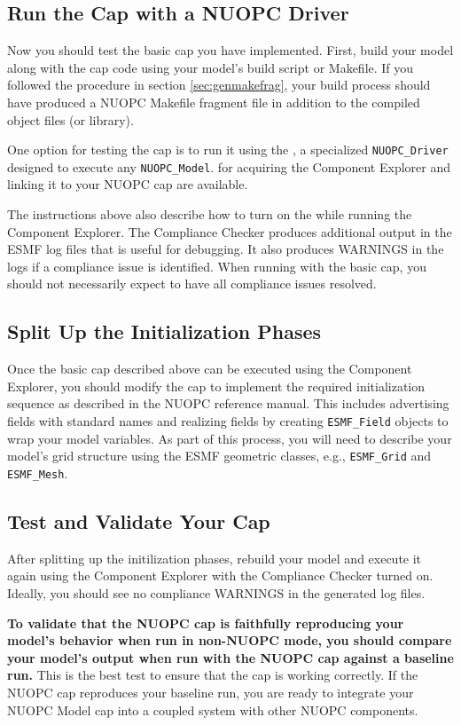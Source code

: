 \subsection{Run the Cap with a NUOPC Driver}
\label{sec:runcapwithdriver}
Now you should test the basic cap you have implemented. First,
build your model along with the cap code using your model's build
script or Makefile.  If you followed the procedure in section \ref{sec:genmakefrag}, 
your build process should have produced a NUOPC Makefile
fragment file in addition to the compiled object files (or library).

One option for testing the cap is to run it using the , a specialized {\tt NUOPC\_Driver} designed to execute any {\tt NUOPC\_Model}.  
 for acquiring 
the Component Explorer and linking it to your NUOPC cap are available.

The instructions above also describe how to turn on the  while running the Component Explorer.  The
Compliance Checker produces additional output in the ESMF log
files that is useful for debugging.  It also produces WARNINGS
in the logs if a compliance issue is identified.  When running with
the basic cap, you should not necessarily expect to have all compliance issues
resolved.


\subsection{Split Up the Initialization Phases}
\label{sec:splitinit}
Once the basic cap described above can be executed using the Component Explorer,
you should modify the cap to implement the required initialization sequence
as described in the NUOPC reference manual. This
includes advertising fields with standard names and realizing fields by creating
{\tt ESMF\_Field} objects to wrap your model variables.  As part of this process,
you will need to describe your model's grid structure using the ESMF geometric
classes, e.g., {\tt ESMF\_Grid} and {\tt ESMF\_Mesh}.


\subsection{Test and Validate Your Cap}
\label{sec:validatecap}
After splitting up the initilization phases, rebuild your model and execute it again using
the Component Explorer with the Compliance Checker turned on.  Ideally, you
should see no compliance WARNINGS in the generated log files.

\textbf{To validate that the NUOPC cap is faithfully reproducing your model's
behavior when run in non-NUOPC mode, you should compare your model's
output when run with the NUOPC cap against a baseline run.}
This is the best test to ensure that the cap is working correctly.
If the NUOPC cap reproduces your baseline run, you are ready to integrate
your NUOPC Model cap into a coupled system with other NUOPC components.
